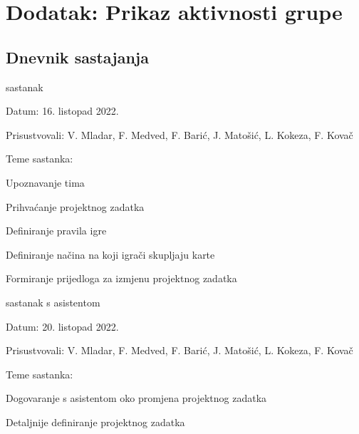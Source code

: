 \chapter*{Dodatak: Prikaz aktivnosti grupe}

		\section*{Dnevnik sastajanja}

		\begin{packed_enum}
			\item  sastanak

			\item[] \begin{packed_item}
				\item Datum: 16. listopad 2022.
				\item Prisustvovali: V. Mladar, F. Medved, F. Barić, J. Matošić, L. Kokeza, F. Kovač
				\item Teme sastanka:
				\begin{packed_item}
					\item  Upoznavanje tima
					\item  Prihvaćanje projektnog zadatka
					\item  Definiranje pravila igre
					\item  Definiranje načina na koji igrači skupljaju karte
					\item  Formiranje prijedloga za izmjenu projektnog zadatka
				\end{packed_item}
			\end{packed_item}
			\bigskip

			\item  sastanak s asistentom
			\item[] \begin{packed_item}
				\item Datum: 20. listopad 2022.
				\item Prisustvovali: V. Mladar, F. Medved, F. Barić, J. Matošić, L. Kokeza, F. Kovač
				\item Teme sastanka:
				\begin{packed_item}
					\item  Dogovaranje s asistentom oko promjena projektnog zadatka
					\item  Detaljnije definiranje projektnog zadatka
				\end{packed_item}
			\end{packed_item}
			\bigskip


\end{packed_enum}
